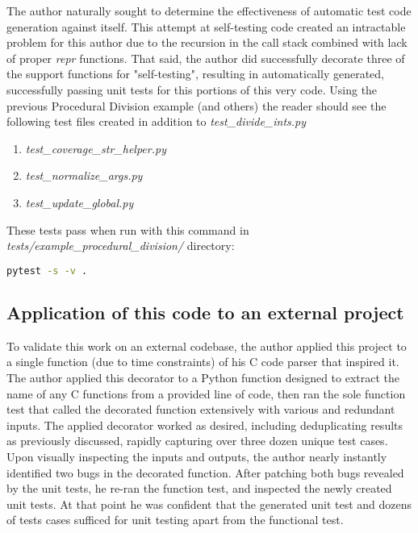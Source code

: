 \documentclass[10pt, conference]{IEEEtran}
\begin{document}
The author naturally sought to determine the effectiveness of automatic
test code generation against itself.  This attempt at self-testing code created 
an intractable problem for this author due to the recursion in the call stack
combined with lack of proper \textit{repr} functions.  That said, the author did 
successfully decorate three of the support functions for "self-testing",
resulting in automatically generated, successfully passing unit tests for this
portions of this very code.  Using the previous Procedural Division example (and others) 
the reader should see the following test files created in addition to 
\textit{test\_divide\_ints.py}

\begin{enumerate}
    \item \textit{test\_coverage\_str\_helper.py}
    \item \textit{test\_normalize\_args.py}
    \item \textit{test\_update\_global.py}
\end{enumerate}

These tests pass when run with this command in 
\linebreak
\textit{tests/example\_procedural\_division/} directory:
\begin{lstlisting}[language=bash, caption={Running all generated unit
   tests for the division example}]
    pytest -s -v .
\end{lstlisting}

\subsection{Application of this code to an external project}\label{sec:eval-2}
To validate this work on an external codebase, the author applied 
this project to a single function (due to time constraints) of his C code
parser that inspired it.  The author applied this
decorator to a Python function designed to extract the name of any C functions 
from a provided line of code, then ran the sole function test that called 
the decorated function extensively with various and redundant inputs.
The applied decorator worked as desired, including deduplicating results as
previously discussed, rapidly capturing over three dozen unique test cases.
Upon visually inspecting the inputs and outputs, the author 
nearly instantly identified two bugs in the decorated function.
After patching both bugs revealed by the unit tests, he re-ran the function test, 
and inspected the newly created unit tests. At that point he was confident that
the generated unit test and dozens of tests cases sufficed for unit testing apart 
from the functional test.
\end{document}
